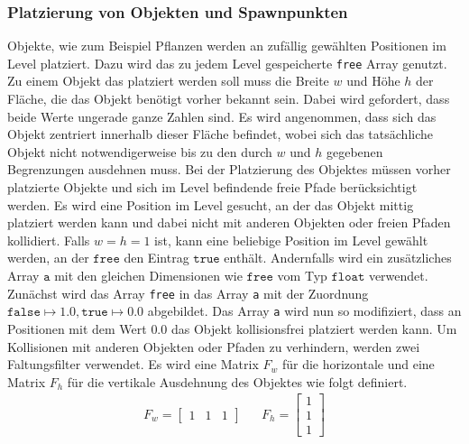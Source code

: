 \subsubsection{Platzierung von Objekten und Spawnpunkten}
Objekte, wie zum Beispiel Pflanzen werden an zufällig gewählten Positionen im Level platziert. Dazu wird das zu jedem Level gespeicherte \texttt{free} Array genutzt. Zu einem Objekt das platziert werden soll muss die Breite $w$ und Höhe $h$ der Fläche, die das Objekt benötigt vorher bekannt sein. Dabei wird gefordert, dass beide Werte ungerade ganze Zahlen sind. Es wird angenommen, dass sich das Objekt zentriert innerhalb dieser Fläche befindet, wobei sich das tatsächliche Objekt nicht notwendigerweise bis zu den durch $w$ und $h$ gegebenen Begrenzungen ausdehnen muss. Bei der Platzierung des Objektes müssen vorher platzierte Objekte und sich im Level befindende freie Pfade berücksichtigt werden. Es wird eine Position im Level gesucht, an der das Objekt mittig platziert werden kann und dabei nicht mit anderen Objekten oder freien Pfaden kollidiert. Falls $w=h=1$ ist, kann eine beliebige Position im Level gewählt werden, an der $\texttt{free}$ den Eintrag $\texttt{true}$ enthält. Andernfalls wird ein zusätzliches Array $\texttt{a}$ mit den gleichen Dimensionen wie $\texttt{free}$ vom Typ $\texttt{float}$ verwendet. Zunächst wird das Array \texttt{free} in das Array \texttt{a} mit der Zuordnung $\texttt{false}\mapsto 1.0, \texttt{true}\mapsto 0.0$ abgebildet. Das Array \texttt{a} wird nun so modifiziert, dass an Positionen mit dem Wert $0.0$ das Objekt kollisionsfrei platziert werden kann. Um Kollisionen mit anderen Objekten oder Pfaden zu verhindern, werden zwei Faltungsfilter verwendet. Es wird eine Matrix $F_w$ für die horizontale und eine Matrix $F_h$ für die vertikale Ausdehnung des Objektes wie folgt definiert. \begin{align*}
    F_w = \begin{bmatrix}
        1&1&1
    \end{bmatrix} && F_h = \begin{bmatrix}
        1\\1\\1
    \end{bmatrix}
\end{align*}
